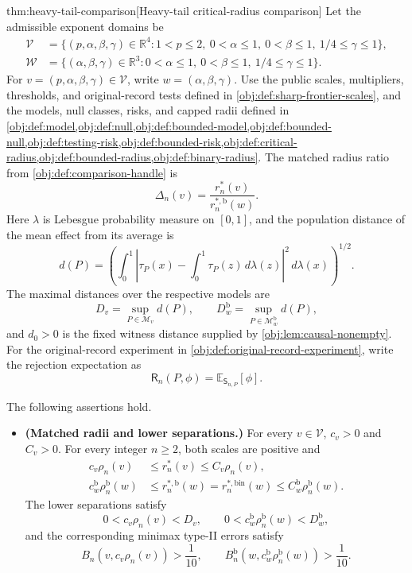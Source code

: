 \documentclass[11pt]{article}
\begin{document}
\begin{theoremv}{thm:heavy-tail-comparison}[Heavy-tail critical-radius comparison]
Let the admissible exponent domains be
\[
\begin{aligned}
\mathcal V
&=\{(p,\alpha,\beta,\gamma)\in\mathbb R^4:
1<p\le2,\ 0<\alpha\le1,\ 0<\beta\le1,\ 1/4\le\gamma\le1\},\\
\mathcal W
&=\{(\alpha,\beta,\gamma)\in\mathbb R^3:
0<\alpha\le1,\ 0<\beta\le1,\ 1/4\le\gamma\le1\}.
\end{aligned}
\]
For \(v=(p,\alpha,\beta,\gamma)\in\mathcal V\), write
\(w=(\alpha,\beta,\gamma)\). Use the public scales, multipliers, thresholds, and original-record tests defined in \cref{obj:def:sharp-frontier-scales}, and the models, null classes, risks, and capped radii defined in \cref{obj:def:model,obj:def:null,obj:def:bounded-model,obj:def:bounded-null,obj:def:testing-risk,obj:def:bounded-risk,obj:def:critical-radius,obj:def:bounded-radius,obj:def:binary-radius}. The matched radius ratio from \cref{obj:def:comparison-handle} is
\[
\Delta_n(v)=\frac{r_n^*(v)}{r_n^{*,\mathrm b}(w)}.
\]
Here \(\lambda\) is Lebesgue probability measure on \([0,1]\), and the population distance of the mean effect from its average is
\[
d(P)=
\left(
\int_0^1
\left|\tau_P(x)-\int_0^1\tau_P(z)\,d\lambda(z)\right|^2
\,d\lambda(x)
\right)^{1/2}.
\]
The maximal distances over the respective models are
\[
D_v=\sup_{P\in\mathcal M_v}d(P),
\qquad
D_w^{\mathrm b}=\sup_{P\in\mathcal M^{\mathrm b}_w}d(P),
\]
and \(d_0>0\) is the fixed witness distance supplied by \cref{obj:lem:causal-nonempty}. For the original-record experiment in \cref{obj:def:original-record-experiment}, write the rejection expectation as
\[
\mathsf R_n(P,\phi)=\mathbb E_{\mathsf S_{n,P}}[\phi].
\]

The following assertions hold.
\begin{itemize}
\item \textbf{(Matched radii and lower separations.)}
For every \(v\in\mathcal V\), \(c_v>0\) and \(C_v>0\). For every integer \(n\ge2\), both scales are positive and
\[
\begin{aligned}
c_v\rho_n(v)
&\le r_n^*(v)\le C_v\rho_n(v),\\
c_w^{\mathrm b}\rho_n^{\mathrm b}(w)
&\le r_n^{*,\mathrm b}(w)
=r_n^{*,\mathrm{bin}}(w)
\le C_w^{\mathrm b}\rho_n^{\mathrm b}(w).
\end{aligned}
\]
The lower separations satisfy
\[
0<c_v\rho_n(v)<D_v,
\qquad
0<c_w^{\mathrm b}\rho_n^{\mathrm b}(w)<D_w^{\mathrm b},
\]
and the corresponding minimax type-II errors satisfy
\[
B_n\!\left(v,c_v\rho_n(v)\right)>\frac1{10},
\qquad
B_n^{\mathrm b}\!\left(w,c_w^{\mathrm b}\rho_n^{\mathrm b}(w)\right)>\frac1{10}.
\]


\end{itemize}
\end{theoremv}
\end{document}
